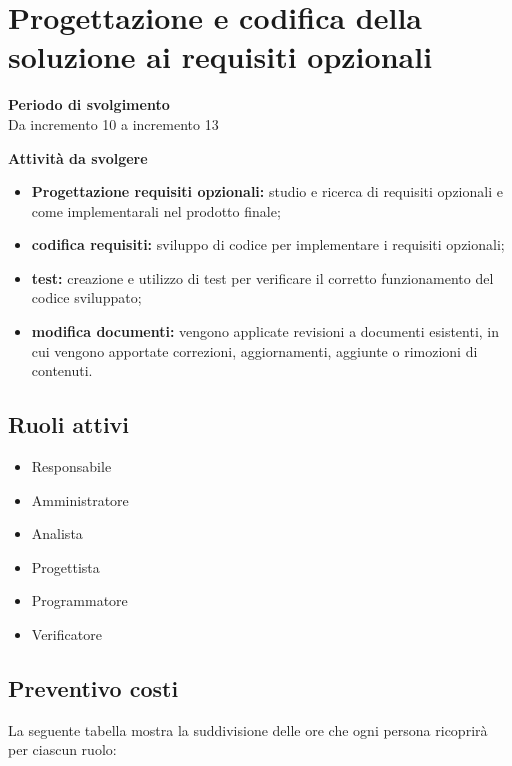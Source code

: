 \section{Progettazione e codifica della soluzione ai requisiti opzionali}

\textbf{Periodo di svolgimento}
\\ Da incremento 10 a incremento 13

\textbf{Attività da svolgere}
    \begin{itemize}
        \item \textbf{Progettazione requisiti opzionali:} studio e ricerca di requisiti opzionali e come implementarali nel prodotto finale; 
        \item \textbf{codifica requisiti:} sviluppo di codice per implementare i requisiti opzionali;
        \item \textbf{test:} creazione e utilizzo di test per verificare il corretto funzionamento del codice sviluppato;
        \item \textbf{modifica documenti:} vengono applicate revisioni a documenti esistenti, in cui vengono apportate correzioni, aggiornamenti, aggiunte o rimozioni di contenuti.
    \end{itemize}

\subsection{Ruoli attivi}
\begin{itemize}
    \item Responsabile 
    \item Amministratore 
    \item Analista 
    \item Progettista 
    \item Programmatore 
    \item Verificatore 
\end{itemize}

\subsection{Preventivo costi}

La seguente tabella mostra la suddivisione delle ore che ogni persona ricoprirà per ciascun ruolo:

